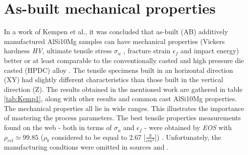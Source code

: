 \section{As-built mechanical properties}
\label{MMABMP}
In a work of Kempen et al., it was concluded that as-built (AB) additively manufactured AlSi10Mg samples can have mechanical properties (Vickers hardness \textit{HV}, ultimate tensile stress $\sigma_u$ , fracture strain $\epsilon_f$ and impact energy) better or at least comparable to the conventionally casted and high pressure die casted (HPDC) alloy \parencite{KEMPEN2012439}. The tensile specimens built in an horizontal direction (XY) had slightly different characteristics than those built in the vertical direction (Z). The results obtained in the mentioned work are gathered in table \ref{tab:Kemp1}, along with other results and common cast AlSi10Mg properties. The mechanical properties all lie in wide ranges. This illustrates the importance of mastering the process parameters. The best tensile properties measurements found on the web - both in terms of $\sigma_u$ and $\epsilon_f$ - were obtained by \textit{EOS} with $\rho_{rel} \simeq 99.85$  ($\rho_b$ considered to be equal to 2.67 [$\frac{g}{cm^3}$]) \parencite{EOS}. Unfortunately, the manufacturing condtions were omitted in sources \parencite{EOS} and \parencite{KEMPEN2012439}.

